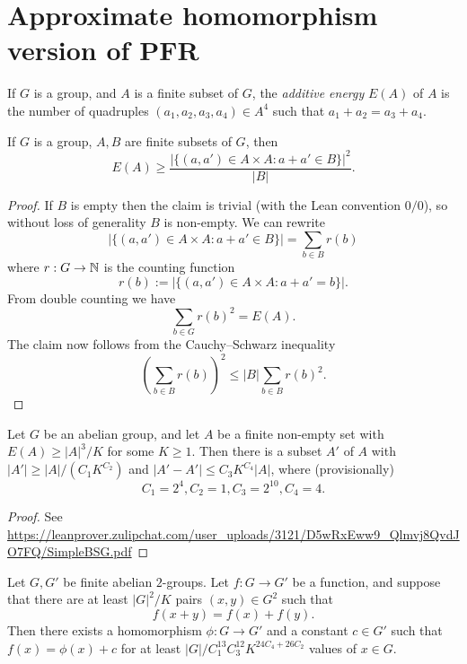\chapter{Approximate homomorphism version of PFR}

\begin{definition}\label{energy-def}\leanok  If $G$ is a group, and $A$ is a finite subset of $G$, the \emph{additive energy} $E(A)$ of $A$ is the number of quadruples $(a_1,a_2,a_3,a_4) \in A^4$ such that $a_1+a_2 = a_3+a_4$.
\end{definition}

\begin{lemma}\label{cs-bound}\leanok  If $G$ is a group, $A,B$ are finite subsets of $G$, then
$$ E(A) \geq \frac{|\{ (a,a') \in A \times A: a+a' \in B \}|^2}{|B|}.$$
\end{lemma}

\begin{proof}\leanok  If $B$ is empty then the claim is trivial (with the Lean convention $0/0$), so without loss of generality $B$ is non-empty.  We can rewrite
$$ |\{ (a,a') \in A \times A: a+a' \in B \}| = \sum_{b \in B} r(b)$$
where $r: G \to \mathbb{N}$ is the counting function
$$ r(b) := |\{ (a,a') \in A \times A: a+a' = b \}|.$$
From double counting we have
$$ \sum_{b \in G} r(b)^2 = E(A).$$
The claim now follows from the Cauchy--Schwarz inequality
$$ (\sum_{b \in B} r(b))^2 \leq |B| \sum_{b \in B} r(b)^2.$$
\end{proof}

\begin{lemma}\label{bsg}\leanok Let $G$ be an abelian group, and let $A$ be a finite non-empty set with $E(A) \geq |A|^3 / K$ for some $K \geq 1$.  Then there is a subset $A'$ of $A$ with $|A'| \geq |A| / (C_1 K^{C_2})$ and $|A'-A'| \leq C_3 K^{C_4} |A|$, where (provisionally)
$$ C_1 = 2^4, C_2 = 1, C_3 = 2^{10}, C_4 = 4.$$
\end{lemma}

\begin{proof} See \url{https://leanprover.zulipchat.com/user_uploads/3121/D5wRxEww9_Qlmvj8QvdJO7FQ/SimpleBSG.pdf}
\end{proof}

\begin{theorem}\label{approx-hom-pfr}\leanok Let $G,G'$ be finite abelian $2$-groups.
  Let $f: G \to G'$ be a function, and suppose that there are at least $|G|^2 / K$ pairs $(x,y) \in G^2$ such that
$$ f(x+y) = f(x) + f(y).$$
Then there exists a homomorphism $\phi: G \to G'$ and a constant $c \in G'$
such that $f(x) = \phi(x)+c$ for at least $|G| / C_1^{13} C_3^{12}
K^{24C_4+26 C_2}$ values of $x \in G$.
\end{theorem}

